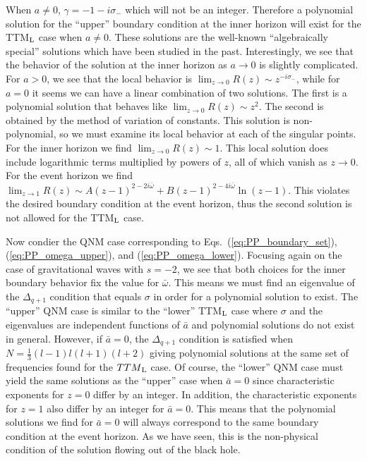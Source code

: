 \documentclass[11pt]{article}
\begin{document}
When $a\ne0$, $\gamma=-1-i\sigma_\minus$ which will not be an integer.
Therefore a polynomial solution for the ``upper'' boundary condition
at the inner horizon will exist for the TTM${}_{\rm{L}}$ case when
$a\ne0$.  These solutions are the well-known ``algebraically special''
solutions which have been studied in the past.  Interestingly, we see
that the behavior of the solution at the inner horizon as $a\to0$ is
slightly complicated.  For $a>0$, we see that the local behavior is
$\lim_{z\to0}R(z)\sim z^{-i\sigma_\minus}$, while for $a=0$ it seems
we can have a linear combination of two solutions.  The first is a
polynomial solution that behaves like $\lim_{z\to0}R(z)\sim z^2$.  The
second is obtained by the method of variation of constants.  This
solution is non-polynomial, so we must examine its local behavior at
each of the singular points.  For the inner horizon we find
$\lim_{z\to0}R(z)\sim 1$. This local solution does include logarithmic
terms multiplied by powers of $z$, all of which vanish as $z\to0$.
For the event horizon we find $\lim_{z\to1}R(z)\sim
A(z-1)^{2-2i\bar\omega}+B(z-1)^{2-4i\bar\omega}\ln(z-1)$.  This violates
the desired boundary condition at the event horizon, thus the second
solution is not allowed for the TTM${}_{\rm L}$ case.

Now condier the QNM case corresponding to
Eqs.~(\ref{eq:PP_boundary_set}), (\ref{eq:PP_omega_upper}), and
(\ref{eq:PP_omega_lower}).  Focusing again on the case of
gravitational waves with $s=-2$, we see that both choices for the
inner boundary behavior fix the value for $\bar\omega$.  This means we
must find an eigenvalue of the $\Delta_{q+1}$ condition that equals
$\sigma$ in order for a polynomial solution to exist.  The ``upper''
QNM case is similar to the ``lower'' TTM${}_{\rm L}$ case where
$\sigma$ and the eigenvalues are independent functions of $\bar{a}$
and polynomial solutions do not exist in general.  However, if
$\bar{a}=0$, the $\Delta_{q+1}$ condition is satisfied when
$N=\frac13(l-1)l(l+1)(l+2)$ giving polynomial solutions at the same
set of frequencies found for the $TTM{}_{\rm L}$ case.  Of course, the
``lower'' QNM case must yield the same solutions as the ``upper'' case
when $\bar{a}=0$ since characteristic exponents for $z=0$ differ by an
integer.  In addition, the characteristic exponents for $z=1$ also
differ by an integer for $\bar{a}=0$.  This means that the polynomial
solutions we find for $\bar{a}=0$ will always correspond to the same
boundary condition at the event horizon.  As we have seen, this is the
non-physical condition of the solution flowing out of the black hole.
\end{document}
